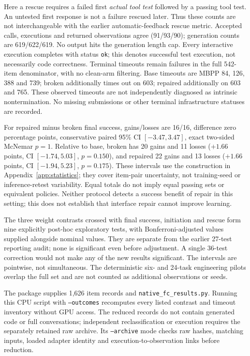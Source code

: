 Here a rescue requires a failed first \emph{actual tool test} followed by a passing
tool test. An untested first response is not a failure rescued later. Thus these
counts are not interchangeable with the earlier automatic-feedback rescue metric.
Accepted calls, executions and returned observations agree (91/93/90); generation
counts are 619/622/619. No output hits the generation length cap. Every interactive
execution completes with status \texttt{ok}; this denotes successful test execution,
not necessarily code correctness. Terminal timeouts remain failures in the full
542-item denominator, with no clean-arm filtering. Base timeouts are MBPP 84, 126,
388 and 739; broken additionally times out on 603; repaired additionally on 603
and 765. These observed timeouts are not independently diagnosed as intrinsic
nontermination. No missing submissions or other terminal infrastructure statuses
are recorded.

For repaired minus broken final success, gains/losses are 16/16, difference zero
percentage points, conservative paired 95\% CI $[-3.47,3.47]$, exact two-sided
McNemar $p=1$. Relative to base, broken has 20 gains and 11 losses
($+1.66$ points, CI $[-1.74,5.03]$, $p=0.150$), and repaired 22 gains and 13 losses
($+1.66$ points, CI $[-1.94,5.23]$, $p=0.175$). These intervals use the construction
in Appendix~\ref{app:statistics}; they cover item-pair uncertainty, not training-seed
or inference-retest variability. Equal totals do not imply equal passing sets or
equivalent policies. Neither protocol detects a success benefit of repair in this
setting; this does not establish that interface repair cannot improve learning.

The three weight contrasts crossed with final success, initiation and rescue form
nine explicitly post-hoc exploratory tests, with Bonferroni-adjusted values supplied
alongside nominal values. They are separate from the earlier 27-test reporting
audit; none is significant even before adjustment. A single 36-test correction
would not make any of the new results significant. The intervals are pointwise,
not simultaneous. The deterministic six- and 24-task engineering pilots overlap
the full set and are not counted as additional observations or seeds.

The package supplies 1,626 item records and
\texttt{native\_\allowbreak fc\_\allowbreak results.py}. Running this CPU script with \texttt{--outcomes}
recomputes every listed contrast and timeout inventory without GPU access.
The reduced records do not contain generated code or full conversations;
independent reclassification or execution requires the separately retained raw
archive. Its \texttt{--archive} mode checks raw hashes, matching inputs,
loaded adapter identity and execution-to-observation links before reduction.
